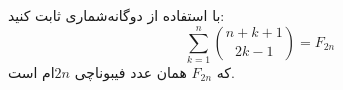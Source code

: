 \EXERCISE
با استفاده از دوگانه‌شماری ثابت کنید:
$$\sum_{k=1}^{n} \binom{n + k + 1}{2k - 1} = F_{2n}$$
که
$F_{2n}$
همان عدد فیبوناچی $2n$ام است.
